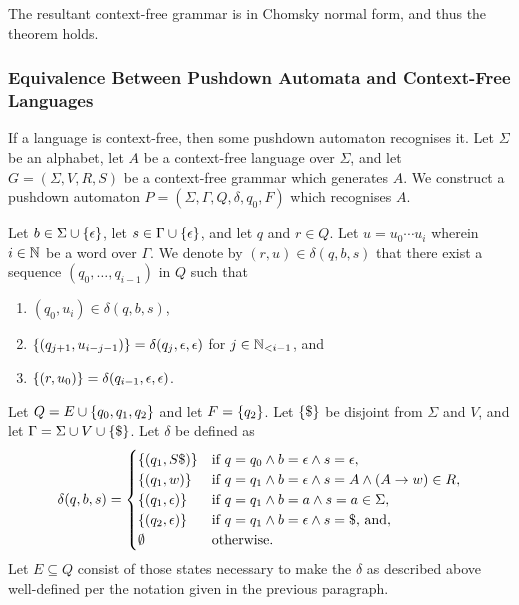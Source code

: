     The resultant context-free grammar is in Chomsky normal form, and thus the
    theorem holds.
\Epr

\subsubsection{Equivalence Between Pushdown Automata and Context-Free Languages}

\Blm
    \label{lem3}
    If a language is context-free, then some pushdown automaton recognises it.
\Elm
\Bpr
    Let \(\Sigma\) be an alphabet, let \(A\) be a context-free language over
    \(\Sigma\), and let \(G = (\Sigma, V, R, S)\) be a context-free grammar
    which generates \(A\).  We construct a pushdown automaton \(P = (\Sigma,
    \Gamma, Q, \delta, q_0, F)\) which recognises \(A\).

    Let \(b \in \Sigma \cup \set{\epsilon}\), let \(s \in \Gamma \cup
    \set{\epsilon}\), and let \(q\) and \(r \in Q\). Let \(u = u_0 \cdots u_i\)
    wherein \(i \in \setnat\) be a word over \(\Gamma\). We denote by \((r, u)
    \in \delta(q, b, s)\) that there exist a sequence \((q_0, \ldots, q_{i -
    1})\) in \(Q\) such that
    \begin{enumerate}
        \item \((q_0, u_i) \in \delta(q, b, s)\),
        \item \(\set{(q_{j + 1}, u_{i - j - 1})} = \delta(q_j, \epsilon,
        \epsilon)\) for \(j \in \Nln[i - 1]\), and
        \item \(\set{(r, u_0)} = \delta(q_{i - 1}, \epsilon, \epsilon)\).
    \end{enumerate}

    Let \(Q = E \cup \set{q_0, q_1, q_2}\) and let \(F = \set{q_2}\). Let
    \(\set{\$}\) be disjoint from \(\Sigma\) and \(V\), and let \(\Gamma =
    \Sigma \cup V \cup \set{\$}\). Let \(\delta\) be defined as
    \[
        \delta(q, b, s) = \begin{cases}
            \set{(q_1, S \$)} & \text{if } q = q_0 \land b = \epsilon \land s =
            \epsilon,\\
            \set{(q_1, w)} & \text{if } q = q_1 \land b = \epsilon \land s = A
            \land (A \to w) \in R,\\
            \set{(q_1, \epsilon)} & \text{if } q = q_1 \land b = a \land s = a
            \in \Sigma,\\
            \set{(q_2, \epsilon)} & \text{if } q = q_1 \land b = \epsilon \land
            s = \$\text{, and},\\
            \nset & \text{otherwise.}
        \end{cases}
    \]
    Let \(E \subseteq Q\) consist of those states necessary to make the
    \(\delta\) as described above well-defined per the notation given in the
    previous paragraph.

